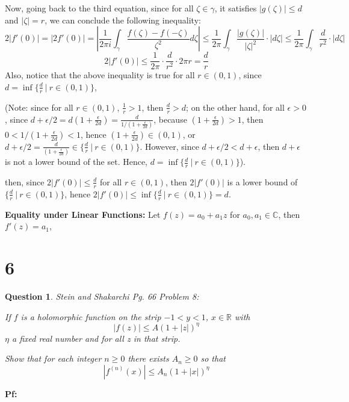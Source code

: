 \documentclass{article}
\newtheorem{question}{Question}
\begin{document}
\hfill

Now, going back to the third equation, since for all $\zeta\in\gamma$, it satisfies $|g(\zeta)|\leq d$ and $|\zeta| = r$, we can conclude the following inequality:
$$2|f'(0)| = |2f'(0)| = \left|\frac{1}{2\pi i}\int_{\gamma}\frac{f(\zeta)-f(-\zeta)}{\zeta^2}d\zeta\right|\leq\frac{1}{2\pi}\int_{\gamma}\frac{|g(\zeta)|}{|\zeta|^2}\cdot|d\zeta| \leq \frac{1}{2\pi}\int_{\gamma}\frac{d}{r^2}\cdot |d\zeta|$$
$$2|f'(0)| \leq \frac{1}{2\pi}\cdot \frac{d}{r^2}\cdot 2\pi r = \frac{d}{r}$$
Also, notice that the above inequality is true for all $r\in (0,1)$, since $d = \inf\{\frac{d}{r}\ |\ r\in(0,1)\}$,

(Note: since for all $r\in (0,1)$, $\frac{1}{r}>1$, then $\frac{d}{r}>d$; on the other hand, for all $\epsilon>0$, since $d+\epsilon/2 = d(1+\frac{\epsilon}{2d}) = \frac{d}{1/(1+\frac{\epsilon}{2d})}$,
because $(1+\frac{\epsilon}{2d})>1$, then $0<1/(1+\frac{\epsilon}{2d})<1$, hence $(1+\frac{\epsilon}{2d})\in (0,1)$, or $d+\epsilon/2=\frac{d}{(1+\frac{\epsilon}{2d})}\in \{\frac{d}{r}\ |\ r\in(0,1)\}$.
However, since $d+\epsilon/2 < d+\epsilon$, then $d+\epsilon$ is not a lower bound of the set. Hence, $d=\inf\{\frac{d}{r}\ |\ r\in(0,1)\}$).

then, since $2|f'(0)| \leq \frac{d}{r}$ for all $r\in(0,1)$, then $2|f'(0)|$ is a lower bound of $\{\frac{d}{r}\ |\ r\in(0,1)\}$,
hence $2|f'(0)| \leq \inf\{\frac{d}{r}\ |\ r\in(0,1)\} = d$.

\hfill

\textbf{Equality under Linear Functions:}
Let $f(z)=a_0+a_1z$ for $a_0,a_1\in\mathbb{C}$, then $f'(z) = a_1$, 

\break

\section*{6}
\begin{myBox}[]{}
    \begin{question}
        Stein and Shakarchi Pg. 66 Problem 8:

        If $f$ is a holomorphic function on the strip $-1 <y< 1$, $x\in\mathbb{R}$ with
        $$|f(z)|\leq A(1+|z|)^\eta$$
        $\eta$ a fixed real number and for all z in that strip.
        
        Show that for each integer $n\geq 0$ there exists $A_n\geq 0$ so that
        $$|f^{(n)}(x)|\leq A_n(1+|x|)^\eta$$
    \end{question}
\end{myBox}

\textbf{Pf:}

\break
\end{document}
